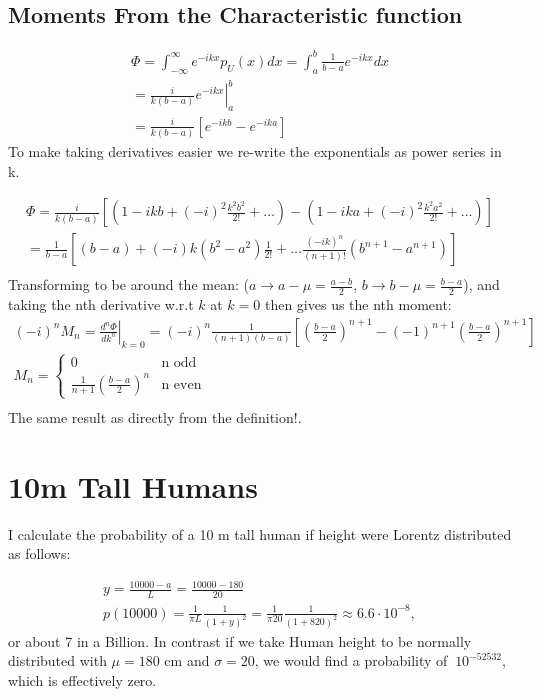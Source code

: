 \documentclass[]{article}
\begin{document}
\subsection{Moments From the Characteristic function}
\begin{align}
\Phi = \int_{-\infty}^{\infty}e^{-i k x}p_U(x)dx = \int_{a}^{b}\frac{1}{b-a}e^{-i k x}dx \nonumber\\
=\left.\frac{i}{k(b-a)}e^{-i k x} \right\vert_a^b\\
= \frac{i}{k(b-a)}\left[e^{-i kb}-e^{-i ka}\right]
\end{align}
To make taking derivatives easier we re-write the exponentials as power series in k.

\begin{align}
\Phi = \frac{i}{k(b-a)} \left[ (1 - i kb +(-i)^2 \frac{k^2b^2}{2!}+ \dots)-\left(1 - i ka +(-i)^2 \frac{k^2a^2}{2!}+ \dots\right)\right] \nonumber\\
= \frac{1}{b-a}\left[(b-a)+(-i) k(b^2-a^2)\frac{1}{2!} + \dots \frac{(-i k)^n}{(n+1)!}(b^{n+1}-a^{n+1})\right]\\
\end{align}
Transforming to be around the mean: ($a\to a-\mu =\frac{a-b}{2}$, $b\to b-\mu =\frac{b-a}{2}$), and taking the nth derivative w.r.t $k$ at $k=0$ then gives us the nth moment:
\begin{align}
(-i)^nM_n = \left.\frac{d^n \Phi}{dk^n}\right\vert_{k=0} = (-i)^n \frac{1}{(n+1)(b-a)}\left[\left(\frac{b-a}{2}\right)^{n+1}- (-1)^{n+1}\left(\frac{b-a}{2}\right)^{n+1}\right] \nonumber\\
M_n = \begin{cases}
0 & \text{n odd} \nonumber\\
\frac{1}{n+1}\left(\frac{b-a}{2}\right)^{n} & \text{n even}
\end{cases}\\
\end{align}
The same result as directly from the definition!.

\section{10m Tall Humans}
I calculate the probability of a 10 m tall human if height were Lorentz distributed as follows:

\begin{align}
y = \frac{10000-a}{L} = \frac{10000-180}{20}\\
p(10000) = \frac{1}{\pi L}\frac{1}{(1+y)^2} = \frac{1}{\pi 20}\frac{1}{(1+820)^2} \approx 6.6\cdot 10^{-8},
\end{align}
or about 7 in a Billion. In contrast if we take Human height to be normally distributed with $\mu=180$ cm and $\sigma=20$, we would find a probability of $~10^{-52532}$, which is effectively zero.
\end{document}
